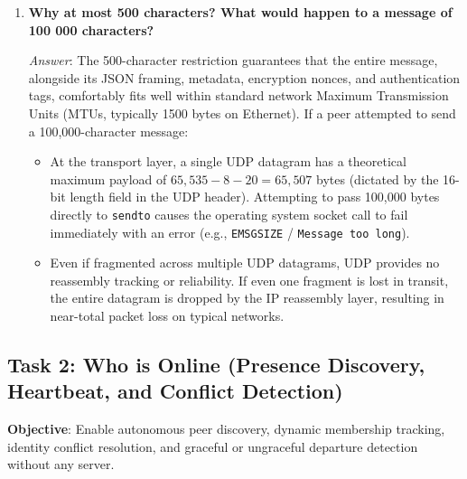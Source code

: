 \documentclass[11pt,a4paper]{article}
\begin{document}
\begin{enumerate}[label=\textbf{Q\arabic*.}, leftmargin=*]
    \textit{Answer}: Because the kernel delivers broadcast datagrams to all bound sockets on the local machine, the sender's broadcast socket inevitably receives its own transmitted packet. To differentiate between incoming messages from external peers and local loopback echoes, each peer instance generates a unique 8-byte random hexadecimal identifier (\texttt{Protocol.MyId}) at launch. Every outgoing datagram contains this \texttt{id}. When a packet arrives, the receiver inspects the field: if \texttt{m.Id == Protocol.MyId}, the application recognizes the datagram as its own loopback echo and discards it, preventing the user's message from being displayed twice.

    \item \textbf{Why at most 500 characters? What would happen to a message of 100 000 characters?}
    
    \textit{Answer}: The 500-character restriction guarantees that the entire message, alongside its JSON framing, metadata, encryption nonces, and authentication tags, comfortably fits well within standard network Maximum Transmission Units (MTUs, typically 1500 bytes on Ethernet). If a peer attempted to send a 100,000-character message:
    \begin{itemize}[noitemsep]
        \item At the transport layer, a single UDP datagram has a theoretical maximum payload of $65,535 - 8 - 20 = 65,507$ bytes (dictated by the 16-bit length field in the UDP header). Attempting to pass 100,000 bytes directly to \texttt{sendto} causes the operating system socket call to fail immediately with an error (e.g., \texttt{EMSGSIZE} / \texttt{Message too long}).
        \item Even if fragmented across multiple UDP datagrams, UDP provides no reassembly tracking or reliability. If even one fragment is lost in transit, the entire datagram is dropped by the IP reassembly layer, resulting in near-total packet loss on typical networks.
    \end{itemize}
\end{enumerate}

\subsection{Task 2: Who is Online (Presence Discovery, Heartbeat, and Conflict Detection)}
\textbf{Objective}: Enable autonomous peer discovery, dynamic membership tracking, identity conflict resolution, and graceful or ungraceful departure detection without any server.
\end{document}
